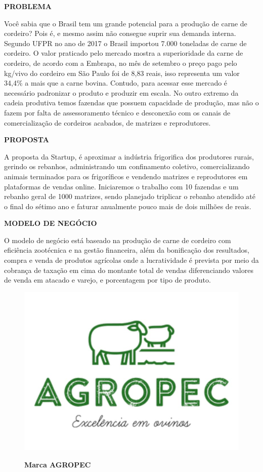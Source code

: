 \textbf{PROBLEMA}

Você sabia que o Brasil tem um grande potencial para a produção de carne de cordeiro? Pois é, e mesmo assim não consegue suprir 
sua demanda interna. Segundo UFPR no ano de 2017 o Brasil importou 7.000 toneladas de carne de cordeiro. O valor praticado pelo mercado mostra a superioridade da carne de cordeiro, de acordo com a Embrapa, no mês de setembro o preço pago pelo kg/vivo do cordeiro em São Paulo foi de 8,83 reais, isso representa um valor 34,4\% a mais que a carne 
bovina. Contudo, para acessar esse mercado é necessário padronizar o produto e produzir em escala. No outro extremo da cadeia produtiva temos fazendas que possuem capacidade de produção, mas não o fazem por falta de assessoramento técnico e desconexão com os canais  de comercialização de cordeiros acabados, de matrizes e reprodutores.

\textbf{PROPOSTA}

A proposta da Startup, é aproximar a indústria frigorifica dos  produtores rurais, gerindo os rebanhos, administrando um 
confinamento coletivo, comercializando animais terminados para os frigoríficos e vendendo matrizes e reprodutores em plataformas de vendas online. Iniciaremos o trabalho com 10 fazendas e um rebanho geral de 1000 matrizes, sendo planejado triplicar o rebanho atendido até o final do sétimo ano e faturar anualmente pouco mais de dois milhões de reais.

\textbf{MODELO DE NEGÓCIO}

O modelo de negócio está baseado na produção de carne de  cordeiro com eficiência zootécnica e na gestão financeira, além 
da bonificação dos resultados, compra e venda de produtos  agrícolas onde a lucratividade é prevista por meio da cobrança de taxação em cima do montante total de vendas diferenciando valores de venda em atacado e varejo, e porcentagem por tipo de produto.


\begin{figure}[!htb]
\centering
\caption{\textbf{Marca AGROPEC}}
\includegraphics[scale=0.2]{Imagens/agropec.jpg}
\label{figura_15}
\end{figure}
\newpage

